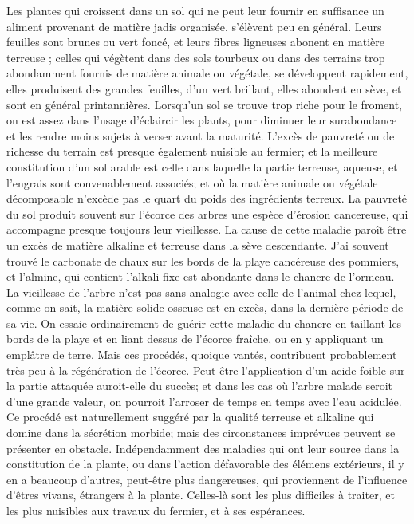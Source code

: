 Les plantes qui croissent dans un sol qui ne peut leur fournir en suffisance un aliment provenant de matière jadis organisée, s'élèvent peu en général. Leurs feuilles sont brunes ou vert foncé, et leurs fibres ligneuses abonent en matière terreuse ; celles qui végètent dans des sols tourbeux ou dans des terrains trop abondamment fournis de matière animale ou végétale, se développent rapidement, elles produisent des grandes feuilles, d'un vert brillant, elles abondent en sève, et sont en général printannières.
Lorsqu'un sol se trouve trop riche pour le froment, on est assez dans l'usage d'éclaircir les plants, pour diminuer leur surabondance et les rendre moins sujets à verser avant la maturité.
L'excès de pauvreté ou de richesse du terrain est presque également nuisible au fermier; et la meilleure constitution d'un sol arable est celle dans laquelle la partie terreuse, aqueuse, et l'engrais sont convenablement associés; et où la matière animale ou végétale décomposable n'excède pas le quart du poids des ingrédients terreux.
La pauvreté du sol produit souvent sur l'écorce des arbres une espèce d'érosion cancereuse, qui accompagne presque toujours\setcounter{page}{135} leur vieillesse. La cause de cette maladie paroît être un excès de matière alkaline et terreuse dans la sève descendante. J'ai souvent trouvé le carbonate de chaux sur les bords de la playe cancéreuse des pommiers, et l'almine, qui contient l'alkali fixe est abondante dans le chancre de l'ormeau. La vieillesse de l'arbre n'est pas sans analogie avec celle de l'animal chez lequel, comme on sait, la matière solide osseuse est en excès, dans la dernière période de sa vie.
On essaie ordinairement de guérir cette maladie du chancre en taillant les bords de la playe et en liant dessus de l'écorce fraîche, ou en y appliquant un emplâtre de terre. Mais ces procédés, quoique vantés, contribuent probablement très-peu à la régénération de l'écorce. Peut-être l'application d'un acide foible sur la partie attaquée auroit-elle du succès; et dans les cas où l'arbre malade seroit d'une grande valeur, on pourroit l'arroser de temps en temps avec l'eau acidulée. Ce procédé est naturellement suggéré par la qualité terreuse et alkaline qui domine dans la sécrétion morbide; mais des circonstances imprévues peuvent se présenter en obstacle.
Indépendamment des maladies qui ont leur\setcounter{page}{136} source dans la constitution de la plante, ou dans l'action défavorable des élémens extérieurs, il y en a beaucoup d'autres, peut-être plus dangereuses, qui proviennent de l'influence d'êtres vivans, étrangers à la plante. Celles-là sont les plus difficiles à traiter, et les plus nuisibles aux travaux du fermier, et à ses espérances.
